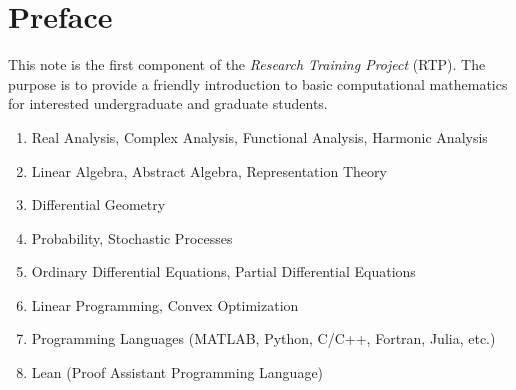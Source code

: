 \chapter*{Preface}

This note is the first component of the \emph{Research Training Project} (RTP).  The purpose is to provide a friendly introduction to basic computational mathematics for interested undergraduate and graduate students.
\vspace{2cm}

{}

\begin{enumerate}
    \item Real Analysis, Complex Analysis, Functional Analysis, Harmonic Analysis
    \item Linear Algebra, Abstract Algebra, Representation Theory
    \item Differential Geometry
    \item Probability, Stochastic Processes
    \item Ordinary Differential Equations, Partial Differential Equations 
    \item Linear Programming, Convex Optimization
    \item Programming Languages (MATLAB, Python, C/C++, Fortran, Julia, etc.)
    \item Lean (Proof Assistant Programming Language)
\end{enumerate}